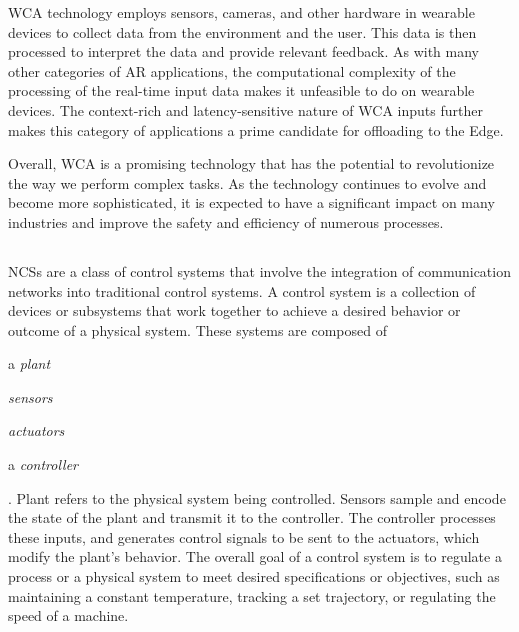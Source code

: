 \gls{WCA} technology employs sensors, cameras, and other hardware in wearable devices to collect data from the environment and the user.
This data is then processed to interpret the data and provide relevant feedback.
As with many other categories of \gls{AR} applications, the computational complexity of the processing of the real-time input data makes it unfeasible to do on wearable devices.
The context-rich and latency-sensitive nature of \gls{WCA} inputs further makes this category of applications a prime candidate for offloading to the Edge.

Overall, \gls{WCA} is a promising technology that has the potential to revolutionize the way we perform complex tasks.
As the technology continues to evolve and become more sophisticated, it is expected to have a significant impact on many industries and improve the safety and efficiency of numerous processes.

\subsection{}\label{background:ncs}

\glspl{NCS} are a class of control systems that involve the integration of communication networks into traditional control systems.
A control system is a collection of devices or subsystems that work together to achieve a desired behavior or outcome of a physical system.
These systems are composed of
\begin{inlineenum}
    \item a \emph{plant}
    \item \emph{sensors}
    \item \emph{actuators}
    \item a \emph{controller}
\end{inlineenum}.
Plant refers to the physical system being controlled.
Sensors sample and encode the state of the plant and transmit it to the controller.
The controller processes these inputs, and generates control signals to be sent to the actuators, which modify the plant's behavior.
The overall goal of a control system is to regulate a process or a physical system to meet desired specifications or objectives, such as maintaining a constant temperature, tracking a set trajectory, or regulating the speed of a machine.

